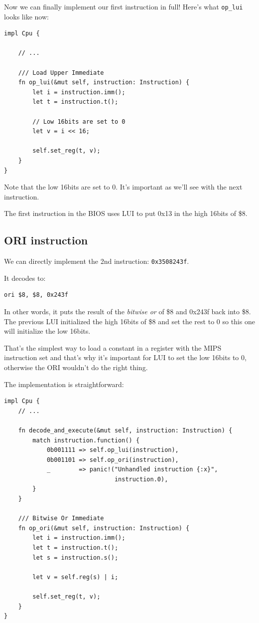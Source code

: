 \documentclass[a4paper]{article}
\newcommand{\code}[1] {\texttt{#1}}
\begin{document}
Now we can finally implement our first instruction in full! Here's
what \code{op\_lui} looks like now:

\begin{lstlisting}
impl Cpu {

    // ...

    /// Load Upper Immediate
    fn op_lui(&mut self, instruction: Instruction) {
        let i = instruction.imm();
        let t = instruction.t();

        // Low 16bits are set to 0
        let v = i << 16;

        self.set_reg(t, v);
    }
}
\end{lstlisting}

Note that the low 16bits are set to 0. It's important as we'll see
with the next instruction.

The first instruction in the BIOS uses LUI to put 0x13 in the high
16bits of \$8.

\subsection{ORI instruction}

We can directly implement the 2nd instruction: \code{0x3508243f}.

It decodes to:

\begin{lstlisting}[language=assembly]
ori $8, $8, 0x243f
\end{lstlisting}

In other words, it puts the result of the \emph{bitwise or} of \$8 and
0x243f back into \$8. The previous LUI initialized the high
16bits of \$8 and set the rest to 0 so this one will initialize the
low 16bits.

That's the simplest way to load a constant in a register with the MIPS
instruction set and that's why it's important for LUI to set the low
16bits to 0, otherwise the ORI wouldn't do the right thing.

The implementation is straightforward:

\begin{lstlisting}
impl Cpu {
    // ...

    fn decode_and_execute(&mut self, instruction: Instruction) {
        match instruction.function() {
            0b001111 => self.op_lui(instruction),
            0b001101 => self.op_ori(instruction),
            _        => panic!("Unhandled instruction {:x}",
                               instruction.0),
        }
    }

    /// Bitwise Or Immediate
    fn op_ori(&mut self, instruction: Instruction) {
        let i = instruction.imm();
        let t = instruction.t();
        let s = instruction.s();

        let v = self.reg(s) | i;

        self.set_reg(t, v);
    }
}
\end{lstlisting}
\end{document}
